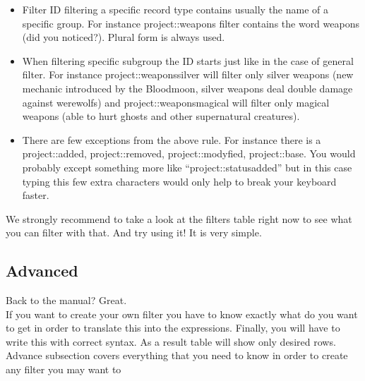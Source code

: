 \begin{itemize}
 \item Filter ID filtering a specific record type contains usually the name of a specific group. For instance project::weapons filter contains the word weapons (did you noticed?). Plural form is always used.
 \item When filtering specific subgroup the ID starts just like in the case of general filter. For instance project::weaponssilver will filter only silver weapons (new mechanic introduced by the Bloodmoon, silver weapons deal double damage against werewolfs) and project::weaponsmagical will filter only magical weapons (able to hurt ghosts and other supernatural creatures).
 \item There are few exceptions from the above rule. For instance there is a project::added, project::removed, project::modyfied, project::base. You would probably except something more like ``project::statusadded'' but in this case typing this few extra characters would only help to break your keyboard faster.
\end{itemize}

We strongly recommend to take a look at the filters table right now to see what you can filter with that. And try using it! It is very simple.

\subsection{Advanced}
Back to the manual? Great.\\
If you want to create your own filter you have to know exactly what do you want to get in order to translate this into the expressions. Finally, you will have to write this with correct syntax. As a result table will show only desired rows.\\
Advance subsection covers everything that you need to know in order to create any filter you may want to %
